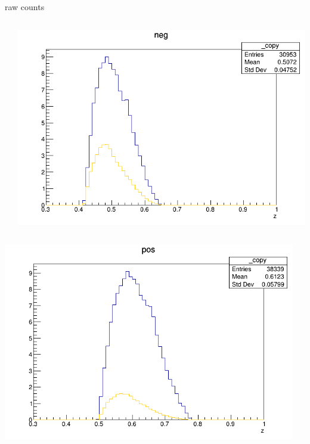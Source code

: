\begin{frame}{raw counts}
\begin{columns}
\begin{column}[T]{0.25\textwidth}
\end{column}
\begin{column}[T]{0.25\textwidth}
\includegraphics[width = \textwidth]{results/yield/statistics/yield_x_Q2_z_0.50_5.000_0.50_neg.png}
\end{column}
\end{columns}
\begin{columns}
\begin{column}[T]{0.25\textwidth}
\includegraphics[width = \textwidth]{results/yield/statistics/yield_x_Q2_z_0.50_5.000_0.60_pos.png}
\end{column}
\begin{column}[T]{0.25\textwidth}

\end{column}
\end{columns}
\end{frame}
